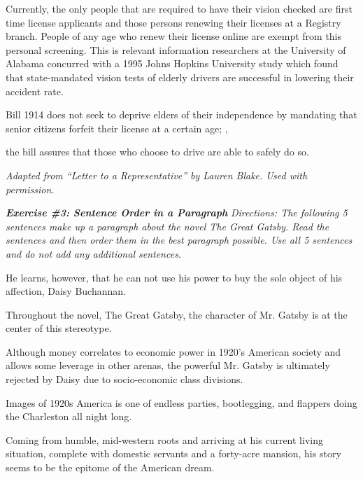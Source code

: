 \begin{spacing}{2}
\begin{linenumbers*}
\indent Currently, the only people that are required to have their vision checked are first time license applicants and those persons renewing their licenses at a Registry branch. People of any age who renew their license online are exempt from this personal screening. This is relevant information \longline researchers at the University of Alabama concurred with a 1995 Johns Hopkins University study which found that state-mandated vision tests of elderly drivers are successful in lowering their accident rate.

\indent \longline Bill 1914 does not seek to deprive elders of their independence by mandating that senior citizens forfeit their license at a certain age; \hrulefill,

the bill assures that those who choose to drive are able to safely do so.
\end{linenumbers*}

\textit{Adapted from “Letter to a Representative” by Lauren Blake. Used with permission. }
\end{spacing}

\bigskip
\textbf{\textit{Exercise \#3: Sentence Order in a Paragraph}}
\bigskip
\textit{Directions: The following 5 sentences make up a paragraph about the novel The Great Gatsby. Read the sentences and then order them in the best paragraph possible. Use all 5 sentences and do not add any additional sentences. }

\bigskip
\underline{\hspace{0.5in}}He learns, however, that he can not use his power to buy the sole object of his affection, Daisy Buchannan. 

\bigskip
\underline{\hspace{0.5in}}Throughout the novel, The Great Gatsby, the character of Mr. Gatsby is at the center of this stereotype. 

\bigskip
\underline{\hspace{0.5in}}Although money correlates to economic power in 1920's American society and allows some leverage in other arenas, the powerful Mr. Gatsby is ultimately rejected by Daisy due to socio-economic class divisions.

\bigskip
\underline{\hspace{0.5in}}Images of 1920s America is one of endless parties, bootlegging, and flappers doing the Charleston all night long. 

\bigskip
\underline{\hspace{0.5in}} Coming from humble, mid-western roots and arriving at his current living situation, complete with domestic servants and a forty-acre mansion, his story seems to be the epitome of the American dream.

